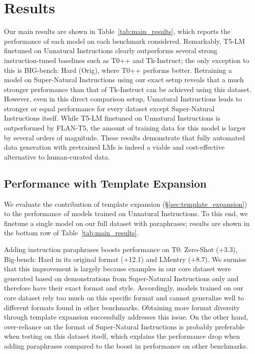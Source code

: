 \section{Results}
\label{sec:experiments}

Our main results are shown in Table~\ref{tab:main_results}, which reports the performance of each model on each benchmark considered. Remarkably, T5-LM finetuned on Unnatural Instructions clearly outperforms several strong instruction-tuned baselines such as T0++ and Tk-Instruct; the only exception to this is BIG-bench: Hard (Orig), where T0++ performs better. Retraining a model on Super-Natural Instructions using our exact setup reveals that a much stronger performance than that of Tk-Instruct can be achieved using this dataset. However, even in this direct comparison setup, Unnatural Instructions leads to stronger or equal performance for every dataset except Super-Natural Instructions itself. While T5-LM finetuned on Unnatural Instructions is outperformed by FLAN-T5, the amount of training data for this model is larger by several orders of magnitude. These results demonstrate that fully automated data generation with pretrained LMs is indeed a viable and cost-effective alternative to human-curated data.

\subsection{Performance with Template Expansion}
\label{sec:full-data-res}
We evaluate the contribution of template expansion (§\ref{sec:template_expansion}) to the performance of models trained on Unnatural Instructions. To this end, we finetune a single model on our full dataset with paraphrases; results are shown in the bottom row of Table~\ref{tab:main_results}.

Adding instruction paraphrases boosts performance on T0: Zero-Shot (+3.3), Big-bench: Hard in its original format (+12.1) and LMentry (+8.7). We surmise that this improvement is largely because examples in our core dataset were generated based on demonstrations from Super-Natural Instructions only and therefore have their exact format and style. Accordingly, models trained on our core dataset rely too much on this specific format and cannot generalize well to different formats found in other benchmarks. Obtaining more format diversity through template expansion successfully addresses this issue. On the other hand, over-reliance on the format of Super-Natural Instructions is probably preferable when testing on this dataset itself, which explains the performance drop when adding paraphrases compared to the boost in performance on other benchmarks.

